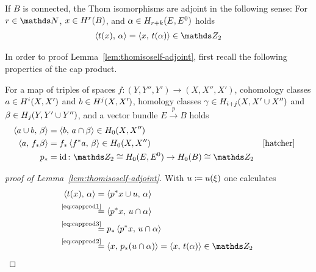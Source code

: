 \begin{Lem}\label{lem:thomisoself-adjoint}
  If $B$ is connected, the Thom isomorphisms are adjoint in the
  following sense:
  For $r\in\Nat$, $x\in H^r(B)$,
  and $\alpha\in H_{r+k}(E, {E}^0)$  holds 
  \begin{gather*}
    \capped{t(x)}{\alpha} = \capped{x}{t(\alpha)} \in\Zmod2
  \end{gather*}
\end{Lem}
In order to proof Lemma~\autoref{lem:thomisoself-adjoint},
first recall the following properties of the cap product.
\begin{Rem}
  For
  a map of triples of spaces
  $f\colon (Y,Y'',Y')\to (X,X'',X')$,
  cohomology classes
  $a\in H^i(X,X')$ and $b\in H^j(X,X')$,
  homology classes
  $\gamma\in H_{i+j}(X, X'\cup X'')$
  and
  $\beta\in H_j(Y, Y'\cup Y'')$,
  and a vector bundle $E\xrightarrow{p}B$
  holds
  \begin{align}
    \label{eq:capprod1}
    \capped{a\cup b}{\beta} &= \capped{b}{a\cap\beta}
                              \in \H_0(X,X'')\\
    \label{eq:capprod2}
    \capped{a}{\pf f \beta} &= \pf f \capped{\pb f a}{\beta}
                              \in \H_0(X,X'')
                            &&\text{\cite[Chap.~3.3.2, p.\,241]{hatcher}}\\
    \label{eq:capprod3}
    \pf p &= \Id \colon
    \Zmod2\cong \H_0(\thomspacepair{E})\to \H_0(B)\cong\Zmod2
  \end{align}
\end{Rem}
\begin{proof}[proof of Lemma~\autoref{lem:thomisoself-adjoint}]
  With $u\coloneqq{u}(\xi)$ one calculates
  \begin{align*}
    \capped{t(x)}{\alpha}
    &= \capped{\pb p x \cup \U}{\alpha} \\
    &\equalsby{\eqref{eq:capprod1}}
      \capped{\pb p x}{\U\cap\alpha} \\
    &\equalsby{\eqref{eq:capprod3}}
      \pf p\capped{\pb p x}{\U\cap\alpha} \\
    &\equalsby{\eqref{eq:capprod2}}
      \capped{x}{\pf p(u\cap\alpha)}
      = \capped{x}{\thomiso (\alpha)} \in\Zmod2
      \qedhere
  \end{align*}
\end{proof}

